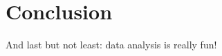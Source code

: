 \section{Conclusion}
\label{sec:conclusion}

And last but not least: data analysis is really fun!

%
%
